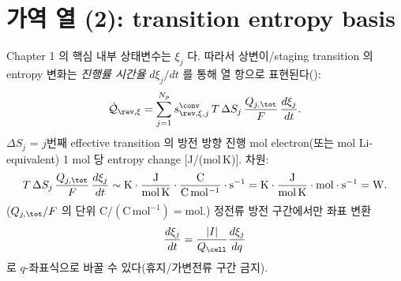 \section{가역 열 (2): transition entropy basis}\label{sec:ch2_revxi}
Chapter 1 의 핵심 내부 상태변수는 $\xi_j$ 다. 따라서 상변이/staging transition 의 entropy 변화는
\emph{진행률 시간율} $d\xi_j/dt$ 를 통해 열 항으로 표현된다():
\begin{equation}
\dot{\mathcal Q}_{\rev,\xi}=\sum_{j=1}^{N_p}s_{\rev,\xi,j}^{\conv}\,T\,\Delta S_j\,\frac{Q_{j,\tot}}{F}\,\frac{d\xi_j}{dt}.
\label{eq:ch2_revxi}
\end{equation}
$\Delta S_j$ = $j$번째 effective transition 의 방전 방향 진행 mol electron(또는 mol Li-equivalent) 1 mol 당
entropy change [J/(mol\,K)]. 차원:
\begin{equation}
T\,\Delta S_j\,\frac{Q_{j,\tot}}{F}\,\frac{d\xi_j}{dt}\sim
\mathrm K\cdot\frac{\mathrm J}{\mathrm{mol\,K}}\cdot\frac{\mathrm C}{\mathrm{C\,mol^{-1}}}\cdot\mathrm s^{-1}
=\mathrm K\cdot\frac{\mathrm J}{\mathrm{mol\,K}}\cdot\mathrm{mol}\cdot\mathrm s^{-1}=\mathrm W.
\label{eq:ch2_revxi_dim}
\end{equation}
($Q_{j,\tot}/F$ 의 단위 $\mathrm C/(\mathrm{C\,mol^{-1}})=\mathrm{mol}$.) 정전류 방전 구간에서만 좌표 변환
\begin{equation}
\frac{d\xi_j}{dt}=\frac{|I|}{Q_\cell}\frac{d\xi_j}{dq}
\label{eq:ch2_revxi_q}
\end{equation}
로 $q$-좌표식으로 바꿀 수 있다(휴지/가변전류 구간 금지).

